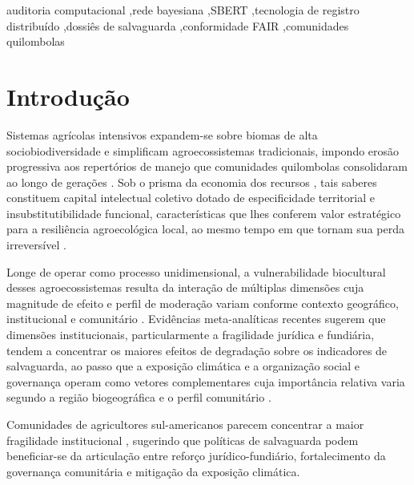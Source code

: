 \documentclass[preprint,12pt,authoryear]{elsarticle}
\begin{document}
\begin{frontmatter}
\begin{keyword}
auditoria computacional \sep rede bayesiana \sep SBERT \sep tecnologia de registro distribuído \sep dossiês de salvaguarda \sep conformidade FAIR \sep comunidades quilombolas
\end{keyword}

\end{frontmatter}

\linenumbers

\section{Introdução}
\label{sec:intro}

Sistemas agrícolas intensivos expandem-se sobre biomas de alta sociobiodiversidade e simplificam agroecossistemas tradicionais, impondo erosão progressiva aos repertórios de manejo que comunidades quilombolas consolidaram ao longo de gerações \citep{Altieri2004}. Sob o prisma da economia dos recursos \citep{Barney1991}, tais saberes constituem capital intelectual coletivo dotado de especificidade territorial e insubstitutibilidade funcional, características que lhes conferem valor estratégico para a resiliência agroecológica local, ao mesmo tempo em que tornam sua perda irreversível \citep{Laborde2023,Ens2016}.

Longe de operar como processo unidimensional, a vulnerabilidade biocultural desses agroecossistemas resulta da interação de múltiplas dimensões cuja magnitude de efeito e perfil de moderação variam conforme contexto geográfico, institucional e comunitário \citep{ReyesGarcia2013,GomezBaggethun2013}. Evidências meta-analíticas recentes sugerem que dimensões institucionais, particularmente a fragilidade jurídica e fundiária, tendem a concentrar os maiores efeitos de degradação sobre os indicadores de salvaguarda, ao passo que a exposição climática e a organização social e governança operam como vetores complementares cuja importância relativa varia segundo a região biogeográfica e o perfil comunitário \citep{Santilli2009,Laird2020}.

Comunidades de agricultores sul-americanos parecem concentrar a maior fragilidade institucional \citep{TangGavin2016,CamaraLeret2021}, sugerindo que políticas de salvaguarda podem beneficiar-se da articulação entre reforço jurídico-fundiário, fortalecimento da governança comunitária e mitigação da exposição climática.
\end{document}
